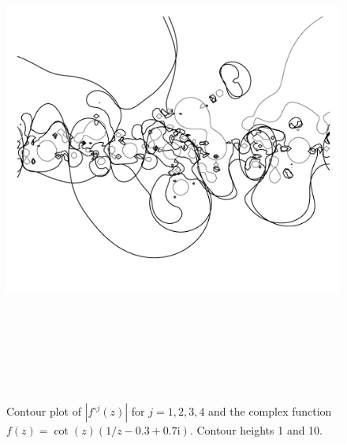 \documentclass[12pt, a4paper]{amsart}
\newcommand{\mi}{\text{i}}  %
\begin{document}
\begin{figure}[!ht] 
\includegraphics[height=160mm, angle=90]{images/embryos.pdf}\\[10mm]
\caption{
Contour plot of $|f^{\circ j}(z)|$ for $j=1, 2, 3, 4$ and the complex function $f(z) = \cot(z)(1/z - 0.3 + 0.7\mi)$.
Contour heights 1 and 10.
}
\end{figure}
\pagebreak
\end{document}
